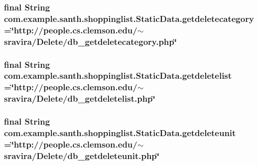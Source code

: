 \subsubsection[{\texorpdfstring{getdeletecategory}{getdeletecategory}}]{\setlength{\rightskip}{0pt plus 5cm}final String com.\+example.\+santh.\+shoppinglist.\+Static\+Data.\+getdeletecategory =\char`\"{}http\+://people.\+cs.\+clemson.\+edu/$\sim$sravira/Delete/db\+\_\+getdeletecategory.\+php\char`\"{}\hspace{0.3cm}{\ttfamily [static]}}\hypertarget{classcom_1_1example_1_1santh_1_1shoppinglist_1_1_static_data_a1f83fd9c57993c3a15c4329b8b5eafc6}{}\label{classcom_1_1example_1_1santh_1_1shoppinglist_1_1_static_data_a1f83fd9c57993c3a15c4329b8b5eafc6}
\subsubsection[{\texorpdfstring{getdeletelist}{getdeletelist}}]{\setlength{\rightskip}{0pt plus 5cm}final String com.\+example.\+santh.\+shoppinglist.\+Static\+Data.\+getdeletelist =\char`\"{}http\+://people.\+cs.\+clemson.\+edu/$\sim$sravira/Delete/db\+\_\+getdeletelist.\+php\char`\"{}\hspace{0.3cm}{\ttfamily [static]}}\hypertarget{classcom_1_1example_1_1santh_1_1shoppinglist_1_1_static_data_ac1c3487b59fa7dc543056e03103f9858}{}\label{classcom_1_1example_1_1santh_1_1shoppinglist_1_1_static_data_ac1c3487b59fa7dc543056e03103f9858}
\subsubsection[{\texorpdfstring{getdeleteunit}{getdeleteunit}}]{\setlength{\rightskip}{0pt plus 5cm}final String com.\+example.\+santh.\+shoppinglist.\+Static\+Data.\+getdeleteunit =\char`\"{}http\+://people.\+cs.\+clemson.\+edu/$\sim$sravira/Delete/db\+\_\+getdeleteunit.\+php\char`\"{}\hspace{0.3cm}{\ttfamily [static]}}\hypertarget{classcom_1_1example_1_1santh_1_1shoppinglist_1_1_static_data_ada7d599d828b29d17bcbfc8764d2f53a}{}\label{classcom_1_1example_1_1santh_1_1shoppinglist_1_1_static_data_ada7d599d828b29d17bcbfc8764d2f53a}
